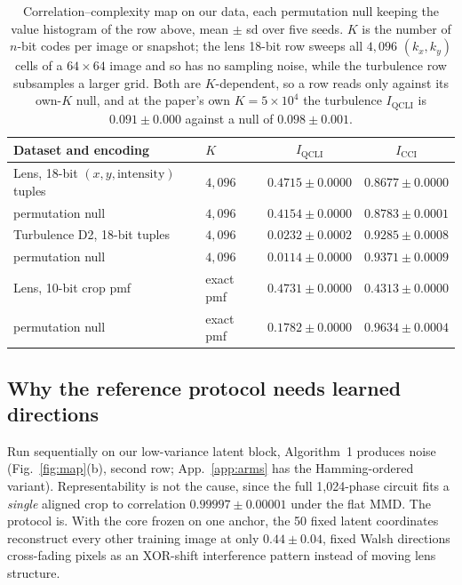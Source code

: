 \documentclass{article}
\newcommand{\qcli}{I_{\mathrm{QCLI}}}
\newcommand{\cci}{I_{\mathrm{CCI}}}
\begin{document}
\begin{table}[tb]
\centering
\caption{Correlation--complexity map on our data, each permutation null keeping the value histogram
of the row above, mean $\pm$ sd over five seeds. $K$ is the number of $n$-bit codes per image or
snapshot; the lens 18-bit row sweeps all $4{,}096$ $(k_x,k_y)$ cells of a $64\times64$ image and so
has no sampling noise, while the turbulence row subsamples a larger grid. Both are $K$-dependent, so
a row reads only against its own-$K$ null, and at the paper's own $K = 5\times10^{4}$ the turbulence
$\qcli$ is $0.091 \pm 0.000$ against a null of $0.098 \pm 0.001$.}
\label{tab:map}
\scriptsize
\begin{tabular}{llcc}
\toprule
Dataset and encoding & $K$ & $\qcli$ & $\cci$ \\
\midrule
Lens, 18-bit $(x, y, \mathrm{intensity})$ tuples & $4{,}096$ & $0.4715 \pm 0.0000$ & $0.8677 \pm 0.0000$ \\
\quad permutation null            & $4{,}096$ & $0.4154 \pm 0.0000$ & $0.8783 \pm 0.0001$ \\
Turbulence D2, 18-bit tuples       & $4{,}096$ & $0.0232 \pm 0.0002$ & $0.9285 \pm 0.0008$ \\
\quad permutation null            & $4{,}096$ & $0.0114 \pm 0.0000$ & $0.9371 \pm 0.0009$ \\
\midrule
Lens, 10-bit crop pmf              & exact pmf & $0.4731 \pm 0.0000$ & $0.4313 \pm 0.0000$ \\
\quad permutation null            & exact pmf & $0.1782 \pm 0.0000$ & $0.9634 \pm 0.0004$ \\
\bottomrule
\end{tabular}
\end{table}

\subsection{Why the reference protocol needs learned directions}
\label{sec:whyfail}

Run sequentially on our low-variance latent block, Algorithm~1 produces noise
(Fig.~\ref{fig:map}(b), second row; App.~\ref{app:arms} has the Hamming-ordered variant).
Representability is not the cause, since the full 1{,}024-phase circuit fits a \emph{single} aligned
crop to correlation $0.99997 \pm 0.00001$ under the flat MMD. The protocol is. With the core frozen
on one anchor, the 50 fixed latent coordinates reconstruct every other training image at only
$0.44 \pm 0.04$, fixed Walsh directions cross-fading pixels as an XOR-shift interference pattern
instead of moving lens structure.
\end{document}
